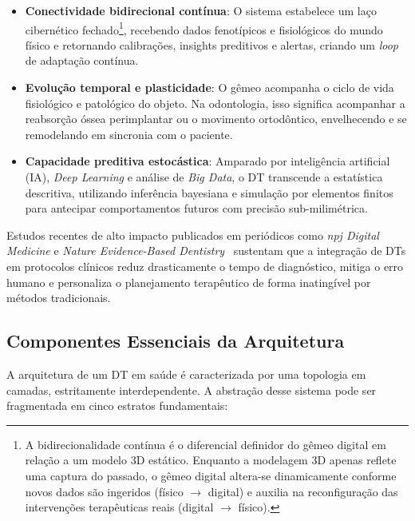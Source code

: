 \begin{itemize}
    \item \textbf{Conectividade bidirecional contínua}: O sistema estabelece um laço cibernético fechado\footnote{A bidirecionalidade contínua é o diferencial definidor do gêmeo digital em relação a um modelo 3D estático. Enquanto a modelagem 3D apenas reflete uma captura do passado, o gêmeo digital altera-se dinamicamente conforme novos dados são ingeridos (físico $\rightarrow$ digital) e auxilia na reconfiguração das intervenções terapêuticas reais (digital $\rightarrow$ físico).}, recebendo dados fenotípicos e fisiológicos do mundo físico e retornando calibrações, insights preditivos e alertas, criando um \textit{loop} de adaptação contínua.
    \item \textbf{Evolução temporal e plasticidade}: O gêmeo acompanha o ciclo de vida fisiológico e patológico do objeto. Na odontologia, isso significa acompanhar a reabsorção óssea perimplantar ou o movimento ortodôntico, envelhecendo e se remodelando em sincronia com o paciente.
    \item \textbf{Capacidade preditiva estocástica}: Amparado por inteligência artificial (IA), \textit{Deep Learning} e análise de \textit{Big Data}, o DT transcende a estatística descritiva, utilizando inferência bayesiana e simulação por elementos finitos para antecipar comportamentos futuros com precisão sub-milimétrica.
\end{itemize}

Estudos recentes de alto impacto publicados em periódicos como \textit{npj Digital Medicine} e \textit{Nature Evidence-Based Dentistry}~\cite{katsoulakis2024digital, duggal2026exploring} sustentam que a integração de DTs em protocolos clínicos reduz drasticamente o tempo de diagnóstico, mitiga o erro humano e personaliza o planejamento terapêutico de forma inatingível por métodos tradicionais.

\subsection{Componentes Essenciais da Arquitetura}

A arquitetura de um DT em saúde é caracterizada por uma topologia em camadas, estritamente interdependente. A abstração desse sistema pode ser fragmentada em cinco estratos fundamentais:

